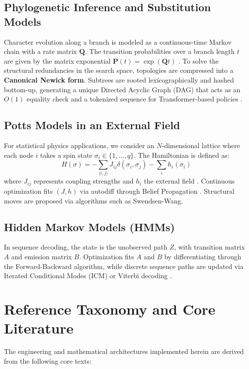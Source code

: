 \documentclass[11pt,a4paper]{article}
\newcommand{\Q}{\mathbf{Q}}
\newcommand{\Pmat}{\mathbf{P}}
\begin{document}
\subsection{Phylogenetic Inference and Substitution Models}
Character evolution along a branch is modeled as a continuous-time Markov chain with a rate matrix $\Q$. The transition probabilities over a branch length $t$ are given by the matrix exponential $\Pmat(t) = \exp(\Q t)$ \citep{felsenstein2004}. 
To solve the structural redundancies in the search space, topologies are compressed into a \textbf{Canonical Newick form}. Subtrees are rooted lexicographically and hashed bottom-up, generating a unique Directed Acyclic Graph (DAG) that acts as an $O(1)$ equality check and a tokenized sequence for Transformer-based policies \citep{raschka2024}.

\subsection{Potts Models in an External Field}
For statistical physics applications, we consider an $N$-dimensional lattice where each node $i$ takes a spin state $\sigma_i \in \{1, \dots, q\}$. The Hamiltonian is defined as:
\begin{equation}
    H(\sigma) = - \sum_{\langle i,j \rangle} J_{ij} \delta(\sigma_i, \sigma_j) - \sum_i h_i(\sigma_i)
\end{equation}
where $J_{ij}$ represents coupling strengths and $h_i$ the external field \citep{mezard2009}. Continuous optimization fits $(J, h)$ via autodiff through Belief Propagation \citep{koller2009}. Structural moves are proposed via algorithms such as Swendsen-Wang.

\subsection{Hidden Markov Models (HMMs)}
In sequence decoding, the state is the unobserved path $Z$, with transition matrix $A$ and emission matrix $B$. Optimization fits $A$ and $B$ by differentiating through the Forward-Backward algorithm, while discrete sequence paths are updated via Iterated Conditional Modes (ICM) or Viterbi decoding \citep{mackay2003}.

\section{Reference Taxonomy and Core Literature}
\label{app:taxonomy}
The engineering and mathematical architectures implemented herein are derived from the following core texts:
\end{document}
